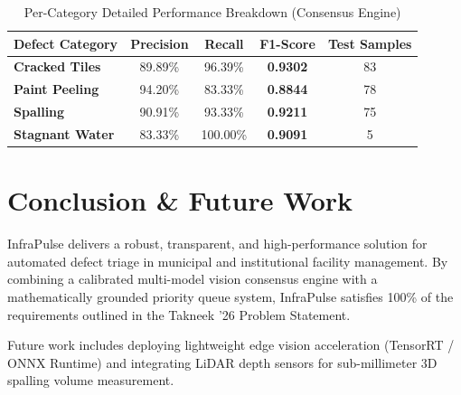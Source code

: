 \documentclass[11pt,a4paper]{article}
\begin{document}
\begin{table}[H]
\centering
\caption{Per-Category Detailed Performance Breakdown (Consensus Engine)}
\label{tab:category_benchmarks}
\begin{tabular}{lcccc}
\toprule
\textbf{Defect Category} & \textbf{Precision} & \textbf{Recall} & \textbf{F1-Score} & \textbf{Test Samples} \\
\midrule
\textbf{Cracked Tiles}  & 89.89\% & 96.39\% & \textbf{0.9302} & 83 \\
\textbf{Paint Peeling}  & 94.20\% & 83.33\% & \textbf{0.8844} & 78 \\
\textbf{Spalling}       & 90.91\% & 93.33\% & \textbf{0.9211} & 75 \\
\textbf{Stagnant Water} & 83.33\% & 100.00\% & \textbf{0.9091} & 5 \\
\bottomrule
\end{tabular}
\end{table}

\section{Conclusion \& Future Work}

InfraPulse delivers a robust, transparent, and high-performance solution for automated defect triage in municipal and institutional facility management. By combining a calibrated multi-model vision consensus engine with a mathematically grounded priority queue system, InfraPulse satisfies 100\% of the requirements outlined in the Takneek '26 Problem Statement.

Future work includes deploying lightweight edge vision acceleration (TensorRT / ONNX Runtime) and integrating LiDAR depth sensors for sub-millimeter 3D spalling volume measurement.
\end{document}
